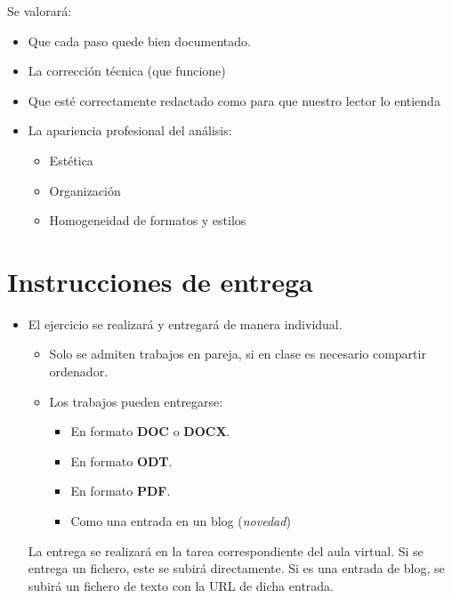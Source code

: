 Se valorará:
\begin{itemize}
\item Que cada paso quede bien documentado. 
\item La corrección técnica (que funcione)
\item Que esté correctamente redactado como para que nuestro lector lo entienda
\item La apariencia profesional del análisis:
  \begin{itemize}
  \item Estética
  \item Organización
  \item Homogeneidad de formatos y estilos
  \end{itemize}
\end{itemize}

\section{Instrucciones de entrega}
\begin{itemize}
\item El ejercicio se realizará y entregará de manera individual.
  \begin{itemize}
  \item Solo se admiten trabajos en pareja, si en clase es necesario compartir ordenador.


  \item Los trabajos pueden entregarse:
    \begin{itemize}
    \item En formato \textbf{DOC} o \textbf{DOCX}.
    \item En formato \textbf{ODT}.
    \item En formato \textbf{PDF}. 
    \item Como una entrada en un blog (\textit{novedad})  
    \end{itemize}
  \end{itemize}

  La entrega se realizará en la tarea correspondiente del aula virtual. Si se entrega un fichero, este se subirá directamente. Si es una entrada de blog, se subirá un fichero de texto con la URL de dicha entrada.

  
\end{itemize}


